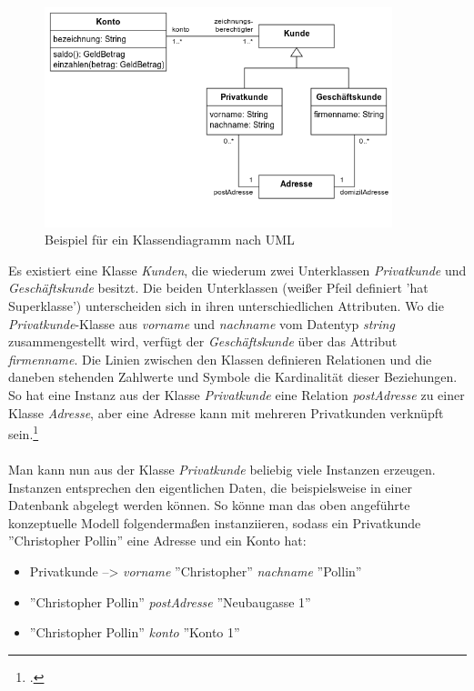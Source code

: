 \documentclass[12pt,a4paper]{article}
\begin{document}
\begin{figure}[H]
\centering
	\includegraphics[width=0.9\textwidth]{img/uml.png}  
    \caption[Klassendiagramm nach UML, de.wikipedia.org/wiki/UML, 10.06.2019]{Beispiel für ein Klassendiagramm nach UML}\label{fig:uml}
\end{figure} 
Es existiert eine Klasse \textit{Kunden}, die wiederum zwei Unterklassen \textit{Privatkunde} und \textit{Geschäftskunde} besitzt. Die beiden Unterklassen (weißer Pfeil definiert 'hat Superklasse') unterscheiden sich in ihren unterschiedlichen Attributen. Wo die \textit{Privatkunde}-Klasse aus \textit{vorname} und \textit{nachname} vom Datentyp \textit{string} zusammengestellt wird, verfügt der \textit{Geschäftskunde} über das Attribut \textit{firmenname}. Die Linien zwischen den Klassen definieren Relationen und die daneben stehenden Zahlwerte und Symbole die Kardinalität dieser Beziehungen. So hat eine Instanz aus der Klasse \textit{Privatkunde} eine Relation \textit{postAdresse} zu einer Klasse \textit{Adresse}, aber eine Adresse kann mit mehreren Privatkunden verknüpft sein.\footcite[][S.99-108]{jannidis2017digital} 
\\
\\
Man kann nun aus der Klasse \textit{Privatkunde} beliebig viele Instanzen erzeugen. Instanzen entsprechen den eigentlichen Daten, die beispielsweise in einer Datenbank abgelegt werden können. So könne man das oben angeführte konzeptuelle Modell folgendermaßen instanziieren, sodass ein Privatkunde ''Christopher Pollin'' eine Adresse und ein Konto hat: 
\begin{itemize}
    \item[] Privatkunde --> \textit{vorname} ''Christopher'' \textit{nachname} ''Pollin''
    \item[] ''Christopher Pollin'' \textit{postAdresse} ''Neubaugasse 1''
    \item[] ''Christopher Pollin'' \textit{konto} ''Konto 1''
\end{itemize}{}
\end{document}
